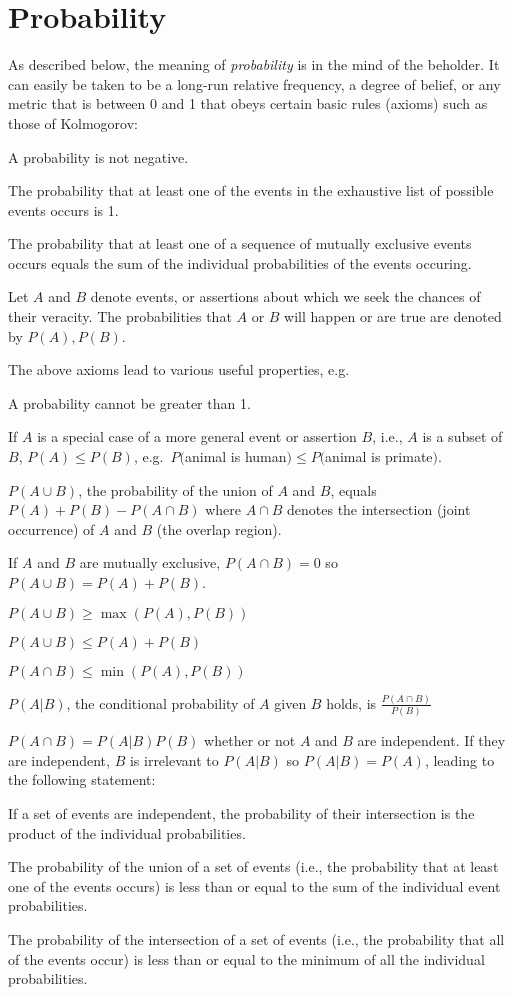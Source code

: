\section{Probability}\label{sec:prob}
%
%
%
As described below, the meaning of \emph{probability} is in the mind
of the beholder.  It can easily be taken to be a long-run relative
frequency, a degree of belief, or any metric that is between 0 and 1
that obeys certain basic rules (axioms) such as those of Kolmogorov:
\be
\item A probability is not negative.
\item The probability that at least one of the events in the exhaustive list of
  possible events occurs is 1.
\item The probability that at least one of a sequence of mutually
  exclusive events occurs equals the sum of the individual
  probabilities of the events occuring.
\ee

Let $A$ and $B$ denote events, or assertions about which we seek the
chances of their veracity.  The probabilities that $A$ or $B$ will
happen or are true are denoted by $P(A), P(B)$.

The above axioms lead to various useful properties, e.g.
\be
\item A probability cannot be greater than 1.
\item If $A$ is a special case of a more general
  event or assertion $B$, i.e., $A$ is a subset of $B$, $P(A) \leq
  P(B)$, e.g.\ $P($animal is human$) \leq P($animal is primate$)$.
\item $P(A \cup B)$, the probability of the union of $A$ and $B$,
  equals $P(A) + P(B) - P(A \cap B)$ where $A \cap B$ denotes the
  intersection (joint occurrence) of $A$ and $B$ (the overlap region).
\item If $A$ and $B$ are mutually exclusive, $P(A \cap B) = 0$ so $P(A
  \cup B) = P(A) + P(B)$.
\item $P(A \cup B) \geq \max(P(A), P(B))$
\item $P(A \cup B) \leq P(A) + P(B)$
\item $P(A \cap B) \leq \min(P(A), P(B))$
\item $P(A | B)$, the conditional probability of $A$ given $B$ holds,
  is $\frac{P(A \cap B)}{P(B)}$
\item $P(A \cap B) = P(A | B) P(B)$ whether or not $A$ and $B$ are
  independent.  If they are independent, $B$ is irrelevant to $P(A |
  B)$ so $P(A | B) = P(A)$, leading to the following statement:
\item If a set of events are independent, the probability of their
  intersection is the product of the individual probabilities.
\item The probability of the union of a set of events (i.e., the
  probability that at least one of the events occurs) is less than or
  equal to the sum of the individual event probabilities.
\item The probability of the intersection of a set of events (i.e.,
  the probability that all of the events occur) is less than or
  equal to the minimum of all the individual probabilities.
\ee


